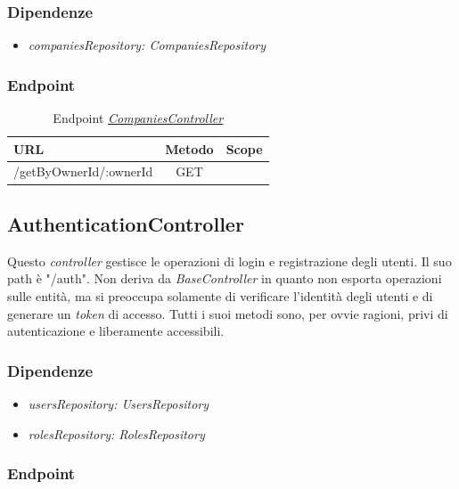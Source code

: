 \subsubsection{Dipendenze}
\begin{itemize}[itemsep=0pt]
	\item \textit{companiesRepository: CompaniesRepository}
\end{itemize}

\subsubsection{Endpoint}

\label{server:companies-controller}
\begin{table}[H]
	\ttfamily
	\caption{Endpoint \hyperref[server:companies-controller]{\textit{CompaniesController}}}
	\centering
	\label{table:api:companies-controller}
	\begin{tabular}{l c c}    
		URL  & Metodo & Scope \\ 
		\midrule
		/getByOwnerId/:ownerId & GET    \\
		\bottomrule
	\end{tabular}
\end{table}

\subsection{AuthenticationController}

Questo \textit{controller} gestisce le operazioni di login e registrazione degli utenti. Il suo path è "/auth". Non deriva da \textit{BaseController} in quanto non esporta operazioni sulle entità, ma si preoccupa solamente di verificare l'identità degli utenti e di generare un \textit{token} di accesso. Tutti i suoi metodi sono, per ovvie ragioni, privi di autenticazione e liberamente accessibili.

\subsubsection{Dipendenze}
\begin{itemize}[itemsep=0pt]
	\item \textit{usersRepository: UsersRepository}
	\item \textit{rolesRepository: RolesRepository}
\end{itemize}

\subsubsection{Endpoint}


